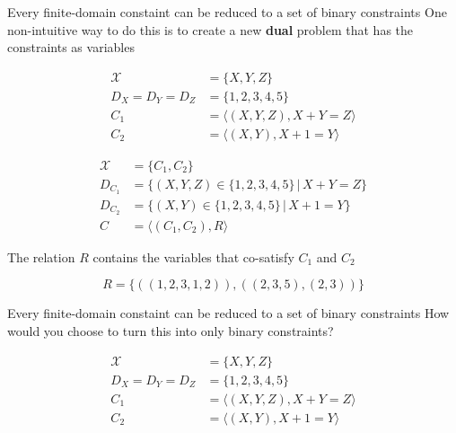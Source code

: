 \documentclass{beamer}
\begin{document}
\begin{frame}{Every finite-domain constaint can be reduced to a set of binary constraints}
\small
    One non-intuitive way to do this is to create a new {\bf dual} problem that
    has the constraints as variables

    \begin{align*}
       \mathcal{X} &= \{X, Y, Z\} \\
       D_X = D_Y = D_Z &= \{1, 2, 3, 4, 5\} \\
       C_1 &= \langle(X,Y, Z), X + Y = Z  \rangle \\
       C_2 &= \langle (X,Y), X + 1 = Y \rangle
    \end{align*}
    
    \begin{align*}
       \mathcal{X} &= \{C_1, C_2\} \\
       D_{C_1} &= \{ (X, Y, Z) \in \{1, 2, 3, 4, 5\} \, | \, X + Y = Z \} \\
       D_{C_2} &= \{ (X, Y) \in \{1, 2, 3, 4, 5\} \,|\, X + 1 = Y \}\\
       C &= \langle(C_1, C_2), R \rangle
    \end{align*}

    The relation $R$ contains the variables that co-satisfy $C_1$ and $C_2$ 

    $$
    R = \{ ((1, 2, 3, 1, 2)), ((2, 3, 5), (2, 3))\}
    $$

    
\end{frame}

\begin{frame}[t]{Every finite-domain constaint can be reduced to a set of binary constraints}
\small
How would you choose to turn this into only binary constraints?

    \begin{align*}
       \mathcal{X} &= \{X, Y, Z\} \\
       D_X = D_Y = D_Z &= \{1, 2, 3, 4, 5\} \\
       C_1 &= \langle(X,Y, Z), X + Y = Z  \rangle \\
       C_2 &= \langle (X,Y), X + 1 = Y \rangle
    \end{align*}
    
\end{frame}
\end{document}
